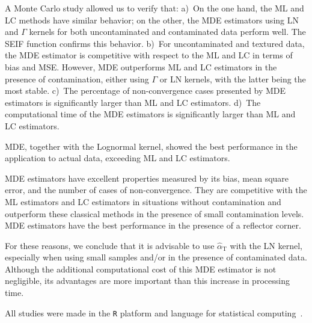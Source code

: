\documentclass[twocolumn]{svjour3}
\begin{document}
A Monte Carlo study allowed us to verify that:
a)~On the one hand, the ML and LC methods have similar behavior; on the other, the MDE estimators using LN and $\Gamma$ kernels for both uncontaminated and contaminated data perform well. 
The SEIF function confirms this behavior.
b)~For uncontaminated and textured data, the MDE estimator is competitive with respect to the ML and LC in terms of bias and MSE. 
However, MDE outperforms ML and LC estimators in the presence of contamination, either using $\Gamma$ or LN kernels, with the latter being the most stable.
c)~The percentage of non-convergence cases presented by MDE estimators is significantly larger than ML and LC estimators.
d)~The computational time of the MDE estimators is significantly larger than ML and LC estimators.

MDE, together with the Lognormal kernel, showed the best performance in the application to actual data, exceeding ML and LC estimators. 

MDE estimators have excellent properties measured by its bias, mean square error, and the number of cases of non-convergence. 
They are competitive with the ML estimators and LC estimators in situations without contamination and outperform these classical methods in the presence of small contamination levels. 
MDE estimators have the best performance in the presence of a reflector corner.

For these reasons, we conclude that it is advisable to use $\widehat{\alpha}_{\text{T}}$ with the LN kernel, especially when using small samples and/or in the presence of contaminated data. 
Although the additional computational cost of this MDE estimator is not negligible, its advantages are more important than this increase in processing time.

All studies were made in the \texttt R platform and language for statistical computing~\cite{RLanguage}.



\end{document}
